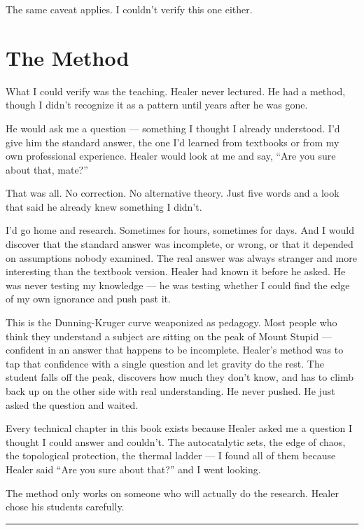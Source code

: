 The same caveat applies. I couldn't verify this one either.

\section*{The Method}
\label{pos05:the-method}

What I could verify was the teaching. Healer never lectured. He had a method, though I didn't recognize it as a pattern until years after he was gone.

He would ask me a question --- something I thought I already understood. I'd give him the standard answer, the one I'd learned from textbooks or from my own professional experience. Healer would look at me and say, ``Are you sure about that, mate?''

That was all. No correction. No alternative theory. Just five words and a look that said he already knew something I didn't.

I'd go home and research. Sometimes for hours, sometimes for days. And I would discover that the standard answer was incomplete, or wrong, or that it depended on assumptions nobody examined. The real answer was always stranger and more interesting than the textbook version. Healer had known it before he asked. He was never testing my knowledge --- he was testing whether I could find the edge of my own ignorance and push past it.

This is the Dunning-Kruger curve weaponized as pedagogy. Most people who think they understand a subject are sitting on the peak of Mount Stupid --- confident in an answer that happens to be incomplete. Healer's method was to tap that confidence with a single question and let gravity do the rest. The student falls off the peak, discovers how much they don't know, and has to climb back up on the other side with real understanding. He never pushed. He just asked the question and waited.

Every technical chapter in this book exists because Healer asked me a question I thought I could answer and couldn't. The autocatalytic sets, the edge of chaos, the topological protection, the thermal ladder --- I found all of them because Healer said ``Are you sure about that?'' and I went looking.

The method only works on someone who will actually do the research. Healer chose his students carefully.

\vspace{1cm}\noindent\rule{0.5\textwidth}{0.5pt}\vspace{0.5cm}

